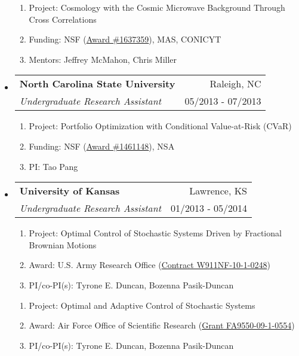 \documentclass[letterpaper,10pt]{article}
\makeatletter
\newcommand{\subheadingtwo}[4]{
\begin{tabular*}{6.5in}{l@{\cftdotfill{\cftsecdotsep}\extracolsep{\fill}}r}
\textbf{#1} & #2 \\
#3 & {#4} \\
\end{tabular*}}
\makeatother
\begin{document}
\begin{itemize}[leftmargin=0.4cm]
\begin{enumerate}[leftmargin=0.5cm]
	\setlength\itemsep{-0.05ex}
	\item[] Project: Cosmology with the Cosmic Microwave Background Through Cross Correlations
	\item[] Funding: NSF (\href{https://www.nsf.gov/awardsearch/showAward?AWD_ID=1637359&HistoricalAwards=false}{Award \#1637359}), MAS, CONICYT
	\item[] Mentors: Jeffrey McMahon, Chris Miller
\end{enumerate}


\vspace{0.1cm}


\item[] \subheadingtwo{North Carolina State University}{Raleigh, NC}{\it Undergraduate Research Assistant}{05/2013 - 07/2013}

\begin{enumerate}[leftmargin=0.5cm]
	\setlength\itemsep{-0.05ex}
	\item[] Project: Portfolio Optimization with Conditional Value-at-Risk (CVaR)
	\item[] Funding: NSF (\href{https://www.nsf.gov/awardsearch/showAward?AWD_ID=1461148&HistoricalAwards=false}{Award \#1461148}), NSA
	\item[] PI: Tao Pang
\end{enumerate}


\vspace{0.2cm}


\item[] \subheadingtwo{University of Kansas}{Lawrence, KS}{\it Undergraduate Research Assistant}{01/2013 - 05/2014}

\begin{enumerate}[leftmargin=0.5cm]
	\setlength\itemsep{-0.05ex}
	\item[] Project: Optimal Control of Stochastic Systems Driven by Fractional Brownian Motions
	\item[] Award: U.S. Army Research Office (\href{http://www.dtic.mil/dtic/tr/fulltext/u2/a614716.pdf}{Contract W911NF-10-1-0248})
	\item[] PI/co-PI(s): Tyrone E. Duncan, Bozenna Pasik-Duncan
\end{enumerate}


\begin{enumerate}[leftmargin=0.5cm]
	\setlength\itemsep{-0.05ex}
	\item[] Project: Optimal and Adaptive Control of Stochastic Systems
	\item[] Award: Air Force Office of Scientific Research (\href{http://www.dtic.mil/dtic/tr/fulltext/u2/a567576.pdf}{Grant FA9550-09-1-0554})
	\item[] PI/co-PI(s): Tyrone E. Duncan, Bozenna Pasik-Duncan
\end{enumerate}



\end{itemize}
\end{document}
